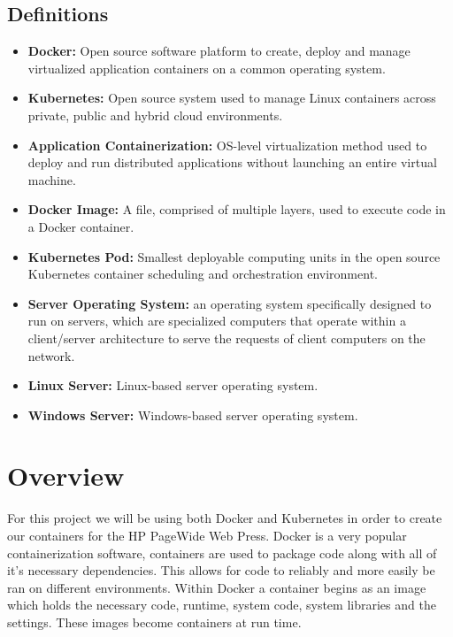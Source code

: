 \documentclass[onecolumn, draftclsnofoot,10pt, compsoc]{IEEEtran}
\begin{document}
\subsection{Definitions}
\begin{itemize}
    \item \textbf{Docker:} Open source software platform to create, deploy and manage virtualized application containers on a common operating system\cite{tech}.
    
\item \textbf{Kubernetes:} Open source system used to manage Linux containers across private, public and hybrid cloud environments\cite{tech}.

\item \textbf{Application Containerization:} OS-level virtualization method used to deploy and run distributed applications without launching an entire virtual machine\cite{tech}.

\item \textbf{Docker Image:} A file, comprised of multiple layers, used to execute code in a Docker container\cite{tech}.

\item \textbf{Kubernetes Pod:} Smallest deployable computing units in the open source Kubernetes container scheduling and orchestration environment\cite{tech}.

\item \textbf{Server Operating System:} an operating system specifically designed to run on servers, which are specialized computers that operate within a client/server architecture to serve the requests of client computers on the network\cite{tech}.

\item \textbf{Linux Server:} Linux-based server operating system\cite{tech}.

\item \textbf{Windows Server:} Windows-based server operating system\cite{tech}.

\end{itemize}	

\section{Overview}
For this project we will be using both Docker and Kubernetes in order to create our containers for the HP PageWide Web Press. Docker is a very popular containerization software, containers are used to package code along with all of it’s necessary dependencies. This allows for code to reliably and more easily be ran on different environments. Within Docker a container begins as an image which holds the necessary code, runtime, system code, system libraries and the settings. These images become containers at run time\cite{kub}. 
\end{document}
